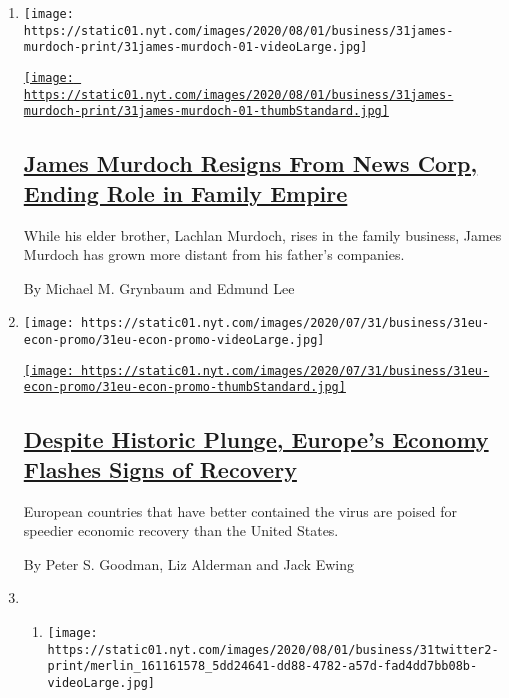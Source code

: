\begin{enumerate}
\def\labelenumi{\arabic{enumi}.}
\item
  \texttt{[image: https://static01.nyt.com/images/2020/08/01/business/31james-murdoch-print/31james-murdoch-01-videoLarge.jpg]}

  \href{/2020/07/31/business/media/james-murdoch-resigns-news-corp.html}{\texttt{[image: https://static01.nyt.com/images/2020/08/01/business/31james-murdoch-print/31james-murdoch-01-thumbStandard.jpg]}}

  \hypertarget{james-murdoch-resigns-from-news-corp-ending-role-in-family-empire}{%
  \subsection{\texorpdfstring{\href{/2020/07/31/business/media/james-murdoch-resigns-news-corp.html}{James
  Murdoch Resigns From News Corp, Ending Role in Family
  Empire}}{James Murdoch Resigns From News Corp, Ending Role in Family Empire}}\label{james-murdoch-resigns-from-news-corp-ending-role-in-family-empire}}

  While his elder brother, Lachlan Murdoch, rises in the family
  business, James Murdoch has grown more distant from his father's
  companies.

  By Michael M. Grynbaum and Edmund Lee
\item
  \texttt{[image: https://static01.nyt.com/images/2020/07/31/business/31eu-econ-promo/31eu-econ-promo-videoLarge.jpg]}

  \href{/2020/07/31/business/europe-economy-recovery-coronavirus.html}{\texttt{[image: https://static01.nyt.com/images/2020/07/31/business/31eu-econ-promo/31eu-econ-promo-thumbStandard.jpg]}}

  \hypertarget{despite-historic-plunge-europes-economy-flashes-signs-of-recovery}{%
  \subsection{\texorpdfstring{\href{/2020/07/31/business/europe-economy-recovery-coronavirus.html}{Despite
  Historic Plunge, Europe's Economy Flashes Signs of
  Recovery}}{Despite Historic Plunge, Europe's Economy Flashes Signs of Recovery}}\label{despite-historic-plunge-europes-economy-flashes-signs-of-recovery}}

  European countries that have better contained the virus are poised for
  speedier economic recovery than the United States.

  By Peter S. Goodman, Liz Alderman and Jack Ewing
\item
  \begin{enumerate}
  \def\labelenumii{\arabic{enumii}.}
  \item
    \texttt{[image: https://static01.nyt.com/images/2020/08/01/business/31twitter2-print/merlin\_161161578\_5dd24641-dd88-4782-a57d-fad4dd7bb08b-videoLarge.jpg]}


\end{enumerate}
\end{enumerate}
